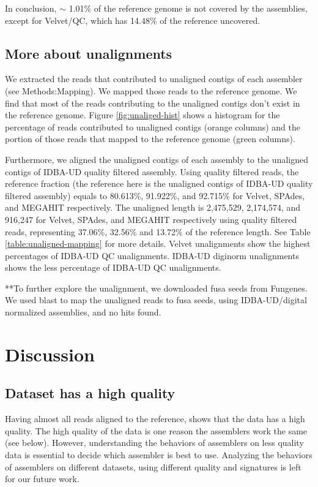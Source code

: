 In conclusion, $\sim$ 1.01\% of the reference genome is not covered by the assemblies, except for Velvet/QC, which has 14.48\% of the reference uncovered. 

\subsection*{More about unalignments}

We extracted the reads that contributed to unaligned contigs of each assembler (see Methods:Mapping). We mapped those reads to the reference genome. We find that most of the reads contributing to the unaligned contigs don't exist in the reference genome.  Figure \ref{fig:unaliged-hist} shows a histogram for the percentage of reads contributed to unaligned contigs (orange columns) and the portion of those reads that mapped to the reference genome (green columns). 


Furthermore, we aligned the unaligned contigs of each assembly to the unaligned contigs of IDBA-UD quality filtered assembly. 
Using quality filtered reads, the reference fraction (the reference here is the unaligned contigs of IDBA-UD quality filtered assembly) equals to 80.613\%, 91.922\%, and 92.715\% for Velvet, SPAdes, and MEGAHIT respectively.  The unaligned length is 2,475,529, 2,174,574, and  916,247  for Velvet, SPAdes, and MEGAHIT respectively using quality filtered reads, representing 37.06\%, 32.56\% and 13.72\% of the reference length. See Table \ref{table:unaligned-mapping} for more details.  Velvet unalignments show the highest percentages of IDBA-UD QC unalignments. IDBA-UD diginorm unalignments shows the less percentage of IDBA-UD QC unalignments. 

**To further explore the unalignment, we downloaded fusa seeds from Fungenes. We used blast to map the unaligned reads to fusa seeds,  using IDBA-UD/digital normalized  assemblies, and no hits found. 


\section*{Discussion}
 
\subsection*{Dataset has a high quality} 
Having almost all reads aligned to the reference, shows that the data has a high quality. The high quality of the data is one reason the assemblers work the same (see below). However, understanding the behaviors of assemblers on less quality data is essential to decide which assembler is best to use. Analyzing the behaviors of assemblers on different datasets, using different quality and signatures is left for our future work.  
 
